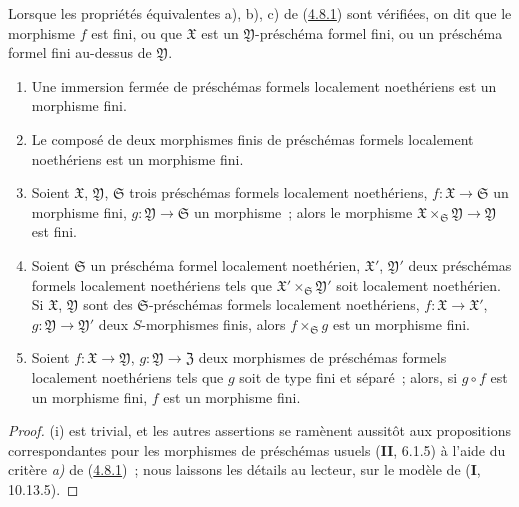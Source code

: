 \begin{definition}[4.8.2]
\label{III.4.8.2-fr}
Lorsque les propriétés équivalentes \textup{a), b), c)} de
\textup{(\hyperref[III.4.8.1-fr]{4.8.1})} sont vérifiées, on dit que le morphisme $f$
est fini, ou que $\mathfrak X$ est un $\mathfrak Y$-préschéma
formel fini, ou un préschéma formel fini au-dessus de $\mathfrak Y$.
\end{definition}

\begin{proposition}[4.8.3]
\label{III.4.8.3-fr}
\begin{enumerate}
\item[\textup{(i)}] Une immersion fermée de préschémas formels localement noethériens
  est un morphisme fini.
\item[\textup{(ii)}] Le composé de deux morphismes finis de préschémas formels
  localement noethériens est un morphisme fini.
\item[\textup{(iii)}] Soient $\mathfrak X$, $\mathfrak Y$, $\mathfrak S$ trois
  préschémas formels localement noethériens, $f:\mathfrak X\to\mathfrak S$ un
  morphisme fini, $g:\mathfrak Y\to\mathfrak S$ un morphisme~; alors le
  morphisme
  $\mathfrak X\times_{\mathfrak S}\mathfrak Y\to\mathfrak Y$ est fini.
\item[\textup{(iv)}] Soient $\mathfrak S$ un préschéma formel localement noethérien,
  $\mathfrak X'$, $\mathfrak Y'$ deux préschémas formels localement
  noethériens tels que $\mathfrak X'\times_{\mathfrak S}\mathfrak Y'$ soit
  localement noethérien. Si $\mathfrak X$, $\mathfrak Y$ sont des
  $\mathfrak S$-préschémas formels localement noethériens,
  $f:\mathfrak X\to\mathfrak X'$, $g:\mathfrak Y\to\mathfrak Y'$ deux
  $S$-morphismes finis, alors $f\times_{\mathfrak S}g$ est un
  morphisme fini.
\item[\textup{(v)}] Soient $f:\mathfrak X\to\mathfrak Y$,
  $g:\mathfrak Y\to\mathfrak Z$ deux morphismes de préschémas formels
  localement noethériens tels que $g$ soit de type fini et séparé~; alors, si
  $g\circ f$ est un morphisme fini, $f$ est un morphisme fini.
\end{enumerate}
\end{proposition}

\begin{proof}
(i) est trivial, et les autres assertions se ramènent aussitôt aux
propositions correspondantes pour les morphismes de préschémas usuels
(\textbf{II}, 6.1.5) à l'aide du critère \emph{a)} de
(\hyperref[III.4.8.1-fr]{4.8.1})~; nous laissons les détails au lecteur, sur le
modèle de (\textbf{I}, 10.13.5).
\end{proof}

